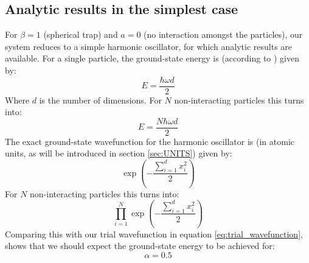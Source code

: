 \documentclass[a4paper, 10pt]{article}
\begin{document}
	\subsection{Analytic results in the simplest case}
	For $\beta=1$ (spherical trap) and $a=0$ (no interaction amongst the particles), our system reduces to a simple harmonic oscillator, for which analytic results are available. For a single particle, the ground-state energy is (according to \cite{Griffiths2004}) given by:
	\begin{equation}
	E=\frac{\hbar \omega d}{2}
	\end{equation}
	Where $d$ is the number of dimensions. For $N$ non-interacting particles this turns into:
	\begin{equation}\label{eq:Exact_Energy_N_particles}
	E=\frac{N\hbar \omega d}{2}
	\end{equation}
	The exact ground-state wavefunction for the harmonic oscillator is (in atomic units, as will be introduced in section \ref{sec:UNITS}) given by:
	\begin{equation}
	\exp\left(-\frac{\sum_{i=1}^d x_i^2}{2}\right)
	\end{equation}
	For $N$ non-interacting particles this turns into:
	\begin{equation}
	\prod_{i=1}^N 	\exp\left(-\frac{\sum_{i=1}^d x_i^2}{2}\right)
	\end{equation}
	Comparing this with our trial wavefunction in equation \ref{eq:trial_wavefunction}, shows that we should expect the ground-state energy to be achieved for:
	\begin{equation}\label{eq:exact_alpha}
	\alpha=0.5
	\end{equation}
\end{document}
